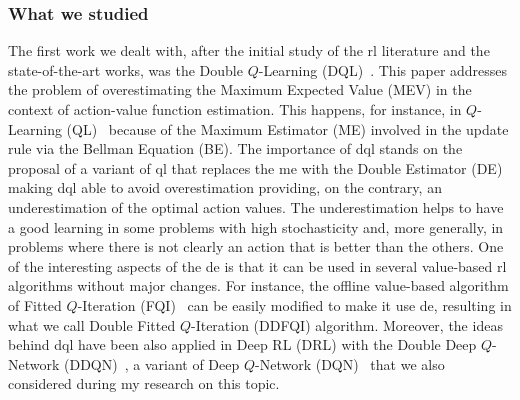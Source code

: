\subsubsection{What we studied}
The first work we dealt with, after the initial study of the \gls{rl} literature and the state-of-the-art works, was the Double $Q$-Learning (DQL)~\cite{van2010double}. This paper addresses the problem of overestimating the Maximum Expected Value (MEV) in the context of action-value function estimation. This happens, for instance, in $Q$-Learning (QL)~\cite{smith2006optimizer} because of the Maximum Estimator (ME) involved in the update rule via the Bellman Equation (BE). The importance of \gls{dql} stands on the proposal of a variant of \gls{ql} that replaces the \gls{me} with the Double Estimator (DE) making \gls{dql} able to avoid overestimation providing, on the contrary, an underestimation of the optimal action values. The underestimation helps to have a good learning in some problems with high stochasticity and, more generally, in problems where there is not clearly an action that is better than the others. One of the interesting aspects of the \gls{de} is that it can be used in several value-based \gls{rl} algorithms without major changes. For instance, the offline value-based algorithm of Fitted $Q$-Iteration (FQI)~\cite{ernst2005tree} can be easily modified to make it use \gls{de}, resulting in what we call Double Fitted $Q$-Iteration (DDFQI) algorithm. Moreover, the ideas behind \gls{dql} have been also applied in Deep RL (DRL) with the Double Deep $Q$-Network (DDQN)~\cite{hasselt2015double}, a variant of Deep $Q$-Network (DQN)~\cite{mnih2015human} that we also considered during my research on this topic.

